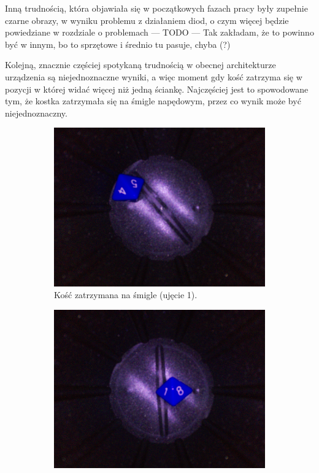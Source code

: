 Inną trudnością, która objawiała się w początkowych fazach pracy były zupełnie czarne obrazy,
w wyniku problemu z działaniem diod, o czym więcej będzie powiedziane w rozdziale o problemach
--- TODO --- Tak zakładam, że to powinno być w innym, bo to sprzętowe i średnio tu pasuje, chyba (?)

Kolejną, znacznie częściej spotykaną trudnością w obecnej architekturze urządzenia są niejednoznaczne wyniki,
a więc moment gdy kość zatrzyma się w pozycji w której widać więcej niż jedną ściankę.
Najczęściej jest to spowodowane tym, że kostka zatrzymała się na śmigle napędowym, przez co wynik może być niejednoznaczny.

\begin{figure}[H]
    \centering
    \begin{subfigure}[t]{0.45\linewidth}
        \centering
        \includegraphics[width=\linewidth]{chapters/04-czytanie/figures/niepewne}
        \caption{Kość zatrzymana na śmigle (ujęcie 1).}
        \label{fig:niepewne}
    \end{subfigure}
    \hfill
    \begin{subfigure}[t]{0.45\linewidth}
        \centering
        \includegraphics[width=\linewidth]{chapters/04-czytanie/figures/smiglo}

\end{subfigure}
\end{figure}
